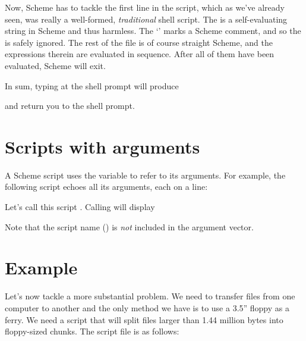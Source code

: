 Now, Scheme has to tackle the first line in the script,
which as we've already seen, was really a well-formed,
{\em traditional} shell script.  The  is a
self-evaluating string in Scheme and thus harmless.
The
`\p{;}' marks a Scheme comment, and so the  is
safely ignored.  The rest of the file is of course
straight Scheme, and the expressions therein are
evaluated in sequence.  After all of them have been
evaluated, Scheme will exit.

In sum, typing  at the shell prompt will produce


and return you to the shell prompt.

\section{Scripts with arguments}

A Scheme script uses the variable  to refer to
its arguments.  For example, the following script
echoes all its arguments, each on a line:


Let's call this script .  Calling  will display


\n Note that the script name () is {\em not} included in
the argument vector.

\section{Example}

Let's now tackle a more substantial problem.  We need
to transfer files from one computer to another and the
only method we have is to use a 3.5'' floppy as a
ferry.  We need a script  that will
split files larger than 1.44 million bytes into
floppy-sized chunks.  The script file 
is as follows:

